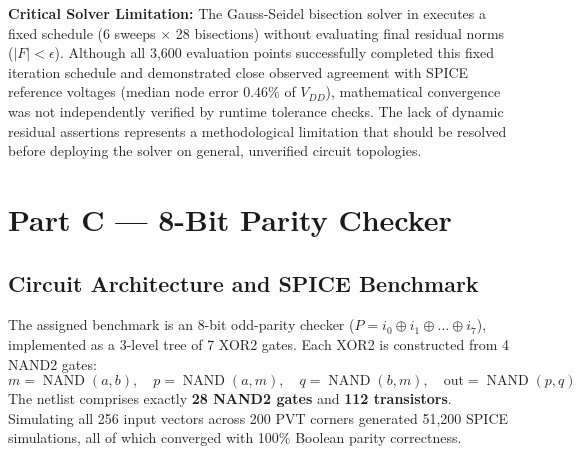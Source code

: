 \documentclass[11pt,a4paper]{article}
\numberwithin{table}{section}
\numberwithin{figure}{section}
\begin{document}
\begin{table}[H]
\centering
\caption{ML-Solved Node Voltage Accuracy Across 18 Gate Cases}
\label{tab:node_volts}
\end{table}

\textbf{Critical Solver Limitation:} The Gauss-Seidel bisection solver in  executes a fixed schedule (6 sweeps $\times$ 28 bisections) without evaluating final residual norms ($|F| < \epsilon$). Although all 3,600 evaluation points successfully completed this fixed iteration schedule and demonstrated close observed agreement with SPICE reference voltages (median node error $0.46\%$ of $V_{DD}$), mathematical convergence was not independently verified by runtime tolerance checks. The lack of dynamic residual assertions represents a methodological limitation that should be resolved before deploying the solver on general, unverified circuit topologies.

\section{Part C — 8-Bit Parity Checker}
\subsection{Circuit Architecture and SPICE Benchmark}
The assigned benchmark is an 8-bit odd-parity checker ($P = i_0 \oplus i_1 \oplus \dots \oplus i_7$), implemented as a 3-level tree of 7 XOR2 gates. Each XOR2 is constructed from 4 NAND2 gates:
\begin{equation}
m = \operatorname{NAND}(a, b), \quad p = \operatorname{NAND}(a, m), \quad q = \operatorname{NAND}(b, m), \quad \mathrm{out} = \operatorname{NAND}(p, q)
\end{equation}
The netlist comprises exactly \textbf{28 NAND2 gates} and \textbf{112 transistors}. Simulating all 256 input vectors across 200 PVT corners generated 51,200 SPICE simulations, all of which converged with 100\% Boolean parity correctness.
\end{document}
